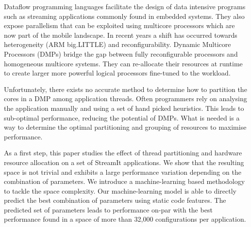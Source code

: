 Dataflow programming languages facilitate the design of data intensive programs such as streaming applications commonly found in embedded systems.
They also expose parallelism that can be exploited using multicore processors which are now part of the mobile landscape.
In recent years a shift has occurred towards heterogeneity (\eg ARM big.LITTLE) and reconfigurability.
Dynamic Multicore Processors (DMPs) bridge the gap between fully reconfigurable processors and homogeneous multicore systems.
They can re-allocate their resources at runtime to create larger more powerful logical processors fine-tuned to the workload.

Unfortunately, there exists no accurate method to determine how to partition the cores in a DMP among application threads.
Often programmers rely on analysing the application manually and using a set of hand picked heuristics.
This leads to sub-optimal performance, reducing the potential of DMPs.
What is needed is a way to determine the optimal partitioning and grouping of resources to maximise performance.

As a first step, this paper studies the effect of thread partitioning and hardware resource allocation on a set of StreamIt applications.
We show that the resulting space is not trivial and exhibits a large performance variation depending on the combination of parameters.
We introduce a machine-learning based methodology to tackle the space complexity.
Our machine-learning model is able to directly predict the best combination of parameters using static code features.
The predicted set of parameters leads to performance on-par with the best performance found in a space of more than 32,000 configurations per application.
